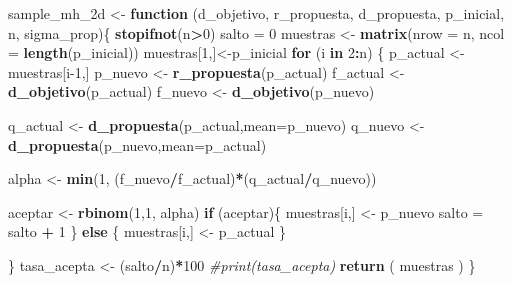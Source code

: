 \documentclass[
]{article}
\newenvironment{Shaded}{\begin{snugshade}}{\end{snugshade}}
\newcommand{\AttributeTok}[1]{\textcolor[rgb]{0.13,0.29,0.53}{#1}}
\newcommand{\CommentTok}[1]{\textcolor[rgb]{0.56,0.35,0.01}{\textit{#1}}}
\newcommand{\ControlFlowTok}[1]{\textcolor[rgb]{0.13,0.29,0.53}{\textbf{#1}}}
\newcommand{\DecValTok}[1]{\textcolor[rgb]{0.00,0.00,0.81}{#1}}
\newcommand{\FunctionTok}[1]{\textcolor[rgb]{0.13,0.29,0.53}{\textbf{#1}}}
\newcommand{\NormalTok}[1]{#1}
\newcommand{\OtherTok}[1]{\textcolor[rgb]{0.56,0.35,0.01}{#1}}
\newcommand{\SpecialCharTok}[1]{\textcolor[rgb]{0.81,0.36,0.00}{\textbf{#1}}}
\begin{document}
\begin{Shaded}
\begin{Highlighting}[]
\NormalTok{sample\_mh\_2d }\OtherTok{\textless{}{-}} \ControlFlowTok{function}\NormalTok{ (d\_objetivo, r\_propuesta, d\_propuesta, p\_inicial, n, sigma\_prop)\{}
  \FunctionTok{stopifnot}\NormalTok{(n}\SpecialCharTok{\textgreater{}}\DecValTok{0}\NormalTok{)}
\NormalTok{  salto }\OtherTok{=} \DecValTok{0}
\NormalTok{  muestras }\OtherTok{\textless{}{-}} \FunctionTok{matrix}\NormalTok{(}\AttributeTok{nrow =}\NormalTok{ n, }\AttributeTok{ncol =} \FunctionTok{length}\NormalTok{(p\_inicial))}
\NormalTok{  muestras[}\DecValTok{1}\NormalTok{,]}\OtherTok{\textless{}{-}}\NormalTok{p\_inicial}
  \ControlFlowTok{for}\NormalTok{ (i }\ControlFlowTok{in} \DecValTok{2}\SpecialCharTok{:}\NormalTok{n) \{}
\NormalTok{    p\_actual }\OtherTok{\textless{}{-}}\NormalTok{ muestras[i}\DecValTok{{-}1}\NormalTok{,]}
\NormalTok{    p\_nuevo }\OtherTok{\textless{}{-}} \FunctionTok{r\_propuesta}\NormalTok{(p\_actual)}
\NormalTok{    f\_actual }\OtherTok{\textless{}{-}} \FunctionTok{d\_objetivo}\NormalTok{(p\_actual)}
\NormalTok{    f\_nuevo }\OtherTok{\textless{}{-}} \FunctionTok{d\_objetivo}\NormalTok{(p\_nuevo)}
    
\NormalTok{    q\_actual }\OtherTok{\textless{}{-}} \FunctionTok{d\_propuesta}\NormalTok{(p\_actual,}\AttributeTok{mean=}\NormalTok{p\_nuevo)}
\NormalTok{    q\_nuevo }\OtherTok{\textless{}{-}} \FunctionTok{d\_propuesta}\NormalTok{(p\_nuevo,}\AttributeTok{mean=}\NormalTok{p\_actual)}
    
\NormalTok{    alpha }\OtherTok{\textless{}{-}} \FunctionTok{min}\NormalTok{(}\DecValTok{1}\NormalTok{, (f\_nuevo}\SpecialCharTok{/}\NormalTok{f\_actual)}\SpecialCharTok{*}\NormalTok{(q\_actual}\SpecialCharTok{/}\NormalTok{q\_nuevo))}
    
\NormalTok{    aceptar }\OtherTok{\textless{}{-}} \FunctionTok{rbinom}\NormalTok{(}\DecValTok{1}\NormalTok{,}\DecValTok{1}\NormalTok{, alpha)}
    \ControlFlowTok{if}\NormalTok{ (aceptar)\{}
\NormalTok{      muestras[i,] }\OtherTok{\textless{}{-}}\NormalTok{ p\_nuevo}
\NormalTok{      salto }\OtherTok{=}\NormalTok{ salto }\SpecialCharTok{+} \DecValTok{1}
\NormalTok{    \} }\ControlFlowTok{else}\NormalTok{ \{}
\NormalTok{      muestras[i,] }\OtherTok{\textless{}{-}}\NormalTok{ p\_actual}
\NormalTok{    \}}
    
\NormalTok{  \}}
\NormalTok{  tasa\_acepta }\OtherTok{\textless{}{-}}\NormalTok{ (salto}\SpecialCharTok{/}\NormalTok{n)}\SpecialCharTok{*}\DecValTok{100}
  \CommentTok{\#print(tasa\_acepta)}
  \FunctionTok{return}\NormalTok{ ( muestras ) }
\NormalTok{\}}
\end{Highlighting}
\end{Shaded}
\end{document}
